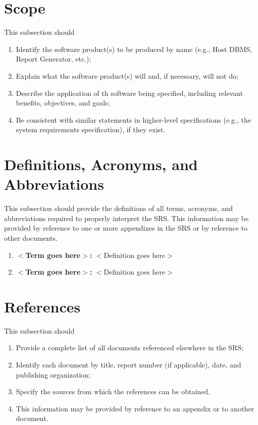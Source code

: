 \documentclass{scrreprt}
\begin{document}
\section{Scope}
This subsection should
\begin{enumerate}
	\item Identify the software product(s) to be produced by name (e.g., Host
		DBMS, Report Generator, etc.);
	\item Explain what the software product(s) will and, if necessary, will not
		do;
	\item Describe the application of th software being specified, including
		relevant benefits, objectives, and goals;
	\item Be consistent with similar statements in higher-level specifications
		(e.g., the system requirements specification), if they exist.
\end{enumerate}

\section{Definitions, Acronyms, and Abbreviations}
This subsection should provide the definitions of all terms, acronyms, and
abbreviations required to properly interpret the SRS. This information may be
provided by reference to one or more appendixes in the SRS or by reference to
other documents.
\begin{enumerate}
	\item \textbf{$<$Term goes here$>$:} $<$Definition goes here$>$
	\item \textbf{$<$Term goes here$>$:} $<$Definition goes here$>$
\end{enumerate}


\section{References}
This subsection should
\begin{enumerate}
	\item Provide a complete list of all documents referenced elsewhere in the SRS;
	\item Identify each document by title, report number (if applicable), date,
		and publishing organization;
	\item Specify the sources from which the references can be obtained.
	\item This information may be provided by reference to an appendix or to
		another document.
\end{enumerate}
\end{document}
